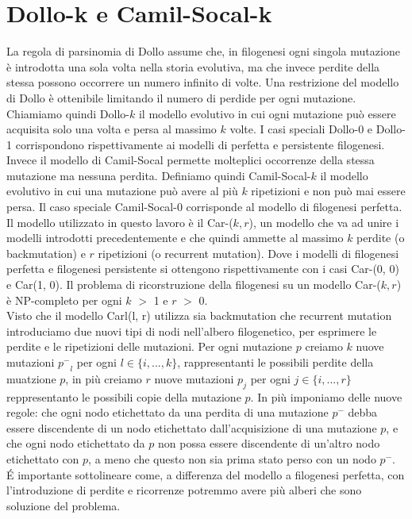 \documentclass{report}
\begin{document}
\section{Dollo-k e Camil-Socal-k}
  La regola di parsinomia di Dollo assume che, in filogenesi ogni singola mutazione è introdotta una sola volta nella storia evolutiva, ma che invece perdite della stessa possono occorrere un numero infinito di volte. Una restrizione del modello di Dollo è ottenibile limitando il numero di perdide per ogni mutazione. Chiamiamo quindi Dollo-$k$ il modello evolutivo in cui ogni mutazione può essere acquisita solo una volta e persa al massimo $k$ volte. I casi speciali Dollo-0 e Dollo-1 corrispondono rispettivamente ai modelli di perfetta e persistente filogenesi.\\
  Invece il modello di Camil-Socal permette molteplici occorrenze della stessa mutazione ma nessuna perdita. Definiamo quindi Camil-Socal-$k$ il modello evolutivo in cui una mutazione può avere al più $k$ ripetizioni e non può mai essere persa. Il caso speciale Camil-Socal-0 corrisponde al modello di filogenesi perfetta.\\
  Il modello utilizzato in questo lavoro è il Car-($k, r$), un modello che va ad unire i modelli introdotti precedentemente e che quindi ammette al massimo $k$ perdite (o backmutation) e $r$ ripetizioni (o recurrent mutation). Dove i modelli di filogenesi perfetta e filogenesi persistente si ottengono rispettivamente con i casi Car-(0, 0) e Car(1, 0). Il problema di ricorstruzione della filogenesi su un modello Car-($k, r$) è NP-completo per ogni $k$ $>$ 1 e $r$ $>$ 0.\\
  Visto che il modello Carl(l, r) utilizza sia backmutation che recurrent mutation introduciamo due nuovi tipi di nodi nell'albero filogenetico, per esprimere le perdite e le ripetizioni delle mutazioni. Per ogni mutazione $p$ creiamo $k$ nuove mutazioni ${p^-}_{l}$ per ogni $l\in\{i, ..., k\}$, rappresentanti le possibili perdite della muatzione $p$, in più creiamo $r$ nuove mutazioni ${p}_{j}$ per ogni $j\in\{i, ..., r\}$ reppresentanto le possibili copie della mutazione $p$.
  In più imponiamo delle nuove regole: che ogni nodo etichettato da una perdita di una mutazione $p^-$ debba essere discendente di un nodo etichettato dall'acquisizione di una mutazione $p$, e che ogni nodo etichettato da $p$ non possa essere discendente di un'altro nodo etichettato con $p$, a meno che questo non sia prima stato perso con un nodo $p^-$.\\
  \'E importante sottolineare come, a differenza del modello a filogenesi perfetta, con l'introduzione di perdite e ricorrenze potremmo avere più alberi che sono soluzione del problema.
\end{document}
